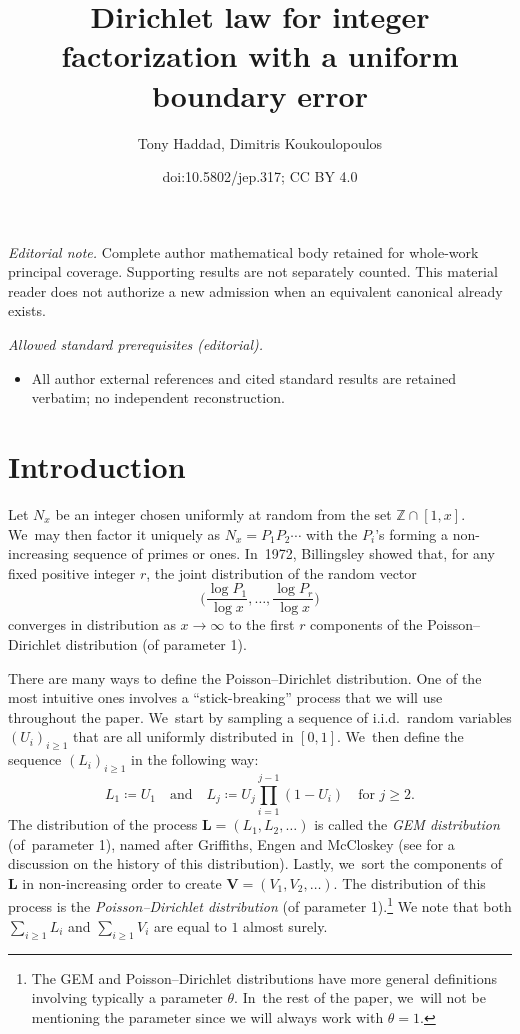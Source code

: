 \documentclass[10pt,a4paper]{amsart}
\title{Dirichlet law for integer factorization with a uniform boundary error}
\author{Tony Haddad, Dimitris Koukoulopoulos}
\date{doi:10.5802/jep.317; CC BY 4.0}
\newcommand{\bL}{{\boldsymbol L}}
\newcommand{\bV}{{\boldsymbol V}}
\newcommand{\ZZ}{\mathbb{Z}}
\newcommand{\bgg}{\Big}
\theoremstyle{plain}
\theoremstyle{definition}
\begin{document}
\maketitle
\noindent\textit{Editorial note.} Complete author mathematical body retained for whole-work principal coverage. Supporting results are not separately counted. This material reader does not authorize a new admission when an equivalent canonical already exists.\par\medskip
\noindent\textit{Allowed standard prerequisites (editorial).}\begin{itemize}
\item All author external references and cited standard results are retained verbatim; no independent reconstruction.
\end{itemize}\medskip
\section{Introduction}
\label{sec:intro}

Let $N_x$ be an integer chosen uniformly at random from the set $\ZZ \cap [1, x]$. We~may then factor it uniquely as $N_x = P_1P_2 \cdots$ with the $P_i$'s forming a non-increasing sequence of primes or ones. In~1972, Billingsley \cite{Bill72} showed that, for any fixed positive integer $r$, the joint distribution of the random vector
\[
\bgg(\frac{\log P_1}{\log x}, \ldots, \frac{\log P_r}{\log x}\bgg)
\]
converges in distribution as $x \to \infty$ to the first $r$ components of the Poisson--Dirichlet distribution (of parameter 1).

There are many ways to define the Poisson--Dirichlet distribution. One of the most intuitive ones involves a ``stick-breaking'' process that we will use throughout the paper. We~start by sampling a sequence of i.i.d.~random variables $(U_i)_{i \ge 1}$ that are all uniformly distributed in $[0, 1]$. We~then define the sequence $(L_i)_{i \ge 1}$ in the following way:
\[
L_1 \coloneqq U_1 \quad \text{and}\quad L_j \coloneqq U_j \prod_{i=1}^{j-1} (1-U_i) \quad \text{for $j \ge 2$.}
\]
The distribution of the process $\bL = (L_1, L_2, \ldots)$ is called the \textit{GEM distribution} (of~parameter 1), named after Griffiths, Engen and McCloskey (see \cite[Ch.\,41]{JKB} for a discussion on the history of this distribution). Lastly, we~sort the components of $\bL$ in non-increasing order to create $\bV = (V_1, V_2, \ldots)$. The distribution of this process is the \textit{Poisson--Dirichlet distribution} (of parameter 1).\footnote{The GEM and Poisson--Dirichlet distributions have more general definitions involving typically a parameter $\theta$. In~the rest of the paper, we~will not be mentioning the parameter since we will always work with $\theta = 1$.} We note that both $\sum_{i \ge 1} L_i$ and $\sum_{i \ge 1} V_i$ are equal to $1$ almost surely.
\end{document}
